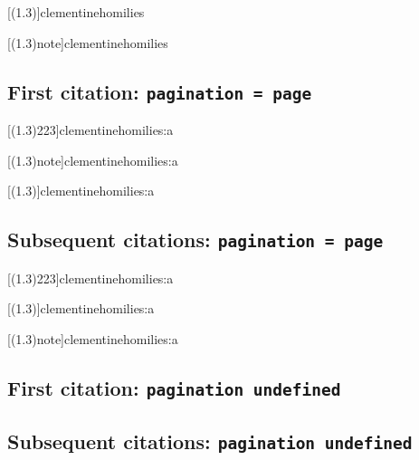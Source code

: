 \documentclass[a4paper]{article}
\begin{document}
[(1.3)]{clementinehomilies}

\AtNextCite{\renewcommand*{\volcitedelim}{\addcomma\space}}
[(1.3)note]{clementinehomilies}

\cite[(1.3)note]{clementinehomilies}

\subsection{First citation: \texttt{pagination = page}}

\cite[(1.3)]{clementinehomilies:a}

\citereset
\cite[(1.3)8:223]{clementinehomilies:a}

\citereset
\cite[(1.3)223]{clementinehomilies:a}

\citereset
{}[(1.3)223]{clementinehomilies:a}

\citereset
{}[(1.3)note]{clementinehomilies:a}

\citereset
{}[(1.3)]{clementinehomilies:a}

\citereset
\cite[(1.3)note]{clementinehomilies:a}

\subsection{Subsequent citations: \texttt{pagination = page}}

\cite[(1.3)]{clementinehomilies:a}

\cite[(1.3)8:223]{clementinehomilies:a}

\cite[(1.3)223]{clementinehomilies:a}

[(1.3)223]{clementinehomilies:a}

[(1.3)]{clementinehomilies:a}

[(1.3)note]{clementinehomilies:a}

\cite[(1.3)note]{clementinehomilies:a}

\subsection{First citation: \texttt{pagination undefined}}

\cite{anderson:pepaideumenos}

\citereset
\cite[86]{anderson:pepaideumenos}

\citereset
\cite[note]{anderson:pepaideumenos}

\subsection{Subsequent citations: \texttt{pagination undefined}}
\end{document}
